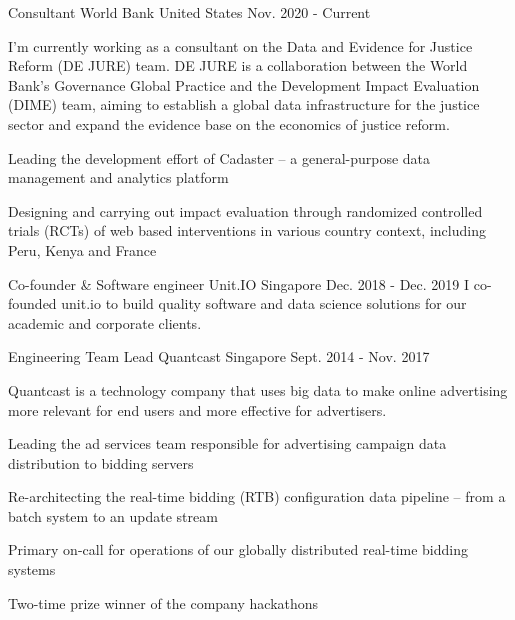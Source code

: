 

\begin{cventries}

  \cventry
    {Consultant} %
    {World Bank} %
    {United States} %
    {Nov. 2020 - Current} %
    {
      I'm currently working as a consultant on the Data and Evidence for Justice Reform (DE JURE) team. DE JURE is a collaboration between the World Bank’s Governance Global Practice and the Development Impact Evaluation (DIME) team, aiming to establish a global data infrastructure for the justice sector and expand the evidence base on the economics of justice reform.
      \begin{cvitems} %
        \item Leading the development effort of Cadaster – a general-purpose data management and analytics platform
        \item Designing and carrying out impact evaluation through randomized controlled trials (RCTs) of web based interventions in various country context, including Peru, Kenya and France
      \end{cvitems}
    }

  \cventry
    {Co-founder \& Software engineer} %
    {Unit.IO} %
    {Singapore} %
    {Dec. 2018 - Dec. 2019} %
    {
      I co-founded unit.io to build quality software and data science solutions for our academic and corporate clients.
    }

  \cventry
    {Engineering Team Lead} %
    {Quantcast} %
    {Singapore} %
    {Sept. 2014 - Nov. 2017} %
    {
      Quantcast is a technology company that uses big data to make online advertising more relevant for end users and more effective for advertisers.
      \begin{cvitems} %
        \item Leading the ad services team responsible for advertising campaign data distribution to bidding servers
        \item Re-architecting the real-time bidding (RTB) configuration data pipeline – from a batch system to an update stream
        \item Primary on-call for operations of our globally distributed real-time bidding systems
        \item Two-time prize winner of the company hackathons
      \end{cvitems}
    }


\end{cventries}
